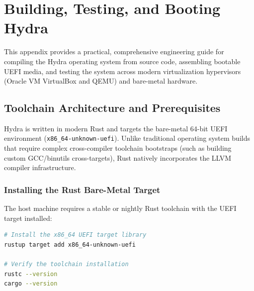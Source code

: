 \chapter{Building, Testing, and Booting Hydra}
\label{app:building}

This appendix provides a practical, comprehensive engineering guide for compiling the Hydra operating system from source code, assembling bootable UEFI media, and testing the system across modern virtualization hypervisors (Oracle VM VirtualBox and QEMU) and bare-metal hardware.

\section{Toolchain Architecture and Prerequisites}
\label{sec:toolchain_deep}

Hydra is written in modern Rust and targets the bare-metal 64-bit UEFI environment (\texttt{x86\_64-unknown-uefi}). Unlike traditional operating system builds that require complex cross-compiler toolchain bootstraps (such as building custom GCC/binutils cross-targets), Rust natively incorporates the LLVM compiler infrastructure.

\subsection{Installing the Rust Bare-Metal Target}
The host machine requires a stable or nightly Rust toolchain with the UEFI target installed:

\begin{lstlisting}[language=bash, caption={Installing Rust Bare-Metal Targets}]
# Install the x86_64 UEFI target library
rustup target add x86_64-unknown-uefi

# Verify the toolchain installation
rustc --version
cargo --version
\end{lstlisting}

